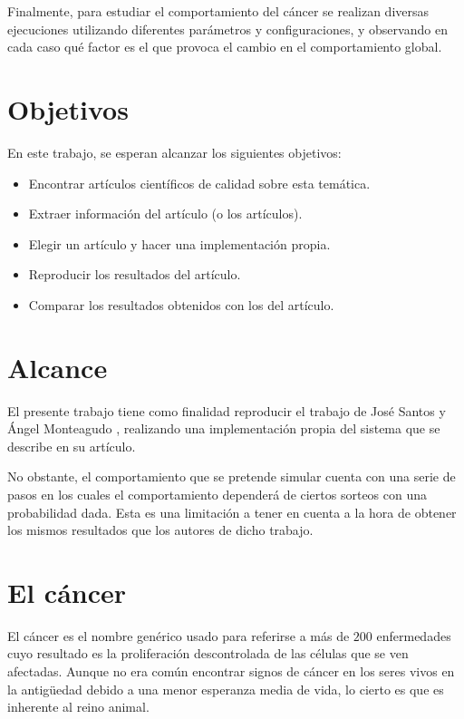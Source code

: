 Finalmente, para estudiar el comportamiento del cáncer se realizan diversas ejecuciones utilizando diferentes parámetros y configuraciones,
y observando en cada caso qué factor es el que provoca el cambio en el comportamiento global.

\section{Objetivos}

En este trabajo, se esperan alcanzar los siguientes objetivos:

\begin{itemize}
  \item Encontrar artículos científicos de calidad sobre esta temática.
  \item Extraer información del artículo (o los artículos).
  \item Elegir un artículo y hacer una implementación propia.
  \item Reproducir los resultados del artículo.
  \item Comparar los resultados obtenidos con los del artículo.
\end{itemize}

\section{Alcance}

El presente trabajo tiene como finalidad reproducir el trabajo de José Santos y Ángel Monteagudo \cite{jsantos-amonteagudo-1-2014}, realizando
una implementación propia del sistema que se describe en su artículo.

No obstante, el comportamiento que se pretende simular cuenta con una serie de pasos en los cuales el comportamiento dependerá
de ciertos sorteos con una probabilidad dada. Esta es una limitación a tener en cuenta a la hora de obtener los mismos resultados
que los autores de dicho trabajo.

\section{El cáncer}

El cáncer es el nombre genérico usado para referirse a más de $200$ enfermedades cuyo resultado
es la proliferación descontrolada de las células que se ven afectadas. Aunque no era común
encontrar signos de cáncer en los seres vivos en la antigüedad debido a una menor esperanza
media de vida, lo cierto es que es inherente al reino animal.

